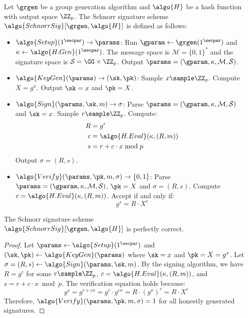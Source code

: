 \begin{definition}\label{def:schnorr}
  Let $\grgen$ be a group generation algorithm and $\algo{H}$ be a hash function with output space $\ZZ_p$. The Schnorr signature scheme $\algo{SchnorrSig}[\grgen, \algo{H}]$ is defined as follows:
  \begin{itemize}
    \item $\algo{Setup}(1^\secpar) \rightarrow \params$: Run $\gparam \gets \grgen(1^\secpar)$ and $\kappa \gets \algo{H.Gen}(1^\secpar)$. The message space is $\mathcal{M} = \{0,1\}^*$ and the signature space is $\mathcal{S} = \GG \times \ZZ_p$. Output $\params = (\gparam, \kappa, \mathcal{M}, \mathcal{S})$.
    
    \item $\algo{KeyGen}(\params) \rightarrow (\sk, \pk)$: Sample $x \sample \ZZ_p$. Compute $X = g^x$. Output $\sk = x$ and $\pk = X$.
    
    \item $\algo{Sign}(\params, \sk, m) \rightarrow \sigma$: Parse $\params = (\gparam, \kappa, \mathcal{M}, \mathcal{S})$ and $\sk = x$. Sample $r \sample \ZZ_p$. Compute:
    \begin{align*}
      R &= g^r \\
      c &= \algo{H.Eval}(\kappa, (R, m)) \\
      s &= r + c \cdot x \bmod p
    \end{align*}
    Output $\sigma = (R, s)$.
    
    \item $\algo{Verify}(\params, \pk, m, \sigma) \rightarrow \{0, 1\}$: Parse $\params = (\gparam, \kappa, \mathcal{M}, \mathcal{S})$, $\pk = X$ and $\sigma = (R, s)$. Compute $c = \algo{H.Eval}(\kappa, (R, m))$. Accept if and only if:
    \[
      g^s = R \cdot X^c
    \]
  \end{itemize}
\end{definition}

\begin{lemma}\label{lem:schnorr-correctness}
  The Schnorr signature scheme\\ $\algo{SchnorrSig}[\grgen, \algo{H}]$ is perfectly correct.
\end{lemma}

\begin{proof}
  Let $\params \gets \algo{Setup}(1^\secpar)$ and $(\sk, \pk) \gets \algo{KeyGen}(\params)$ where $\sk = x$ and $\pk = X = g^x$.
  Let $\sigma = (R, s) \gets \algo{Sign}(\params, \sk, m)$.
  By the signing algorithm, we have $R = g^r$ for some $r \sample \ZZ_p$, $c = \algo{H.Eval}(\kappa, (R, m))$, and $s = r + c \cdot x \bmod p$.
  The verification equation holds because:
  \[
    g^s = g^{r + cx} = g^r \cdot g^{cx} = R \cdot (g^x)^c = R \cdot X^c
  \]
  Therefore, $\algo{Verify}(\params, \pk, m, \sigma) = 1$ for all honestly generated signatures.
\end{proof}

